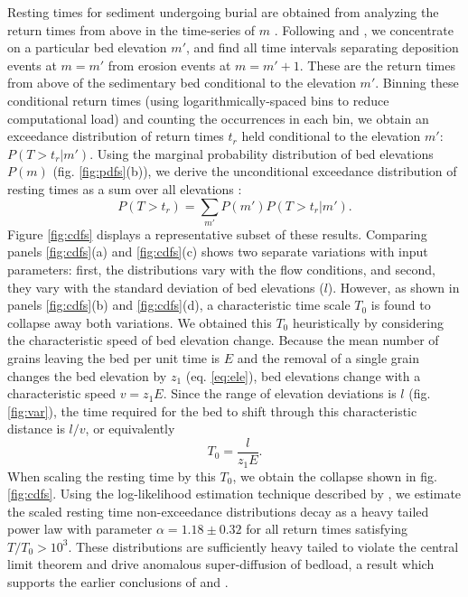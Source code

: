 Resting times for sediment undergoing burial are obtained from analyzing the return times from above in the time-series of $m$ \citep[e.g.,][]{Redner2007}.
Following \citet{Voepel2013} and \citet{Martin2014}, we concentrate on a particular bed elevation $m'$, and find all time intervals separating deposition events at $m=m'$ from erosion events at $m=m'+1$.
These are the return times from above of the sedimentary bed conditional to the elevation $m'$.
Binning these conditional return times (using logarithmically-spaced bins to reduce computational load) and counting the occurrences in each bin, we obtain an exceedance distribution of return times $t_r$ held conditional to the elevation $m'$: $P(T>t_r|m')$.
Using the marginal probability distribution of bed elevations $P(m)$ (fig. \ref{fig:pdfs}(b)), we derive the unconditional exceedance distribution of resting times as a sum over all elevations \citep{Yang1971, Nakagawa1980, Voepel2013, Martin2014}: 
\begin{equation} P(T>t_r) = \sum_{m'} P(m') P(T>t_r|m') .\end{equation}
Figure \ref{fig:cdfs} displays a representative subset of these results.
Comparing panels \ref{fig:cdfs}(a) and \ref{fig:cdfs}(c) shows two separate variations with input parameters: first, the distributions vary with the flow conditions, and second, they vary with the standard deviation of bed elevations ($l$).
However, as shown in panels \ref{fig:cdfs}(b) and \ref{fig:cdfs}(d), a characteristic time scale $T_0$ is found to collapse away both variations.
We obtained this $T_0$ heuristically by considering the characteristic speed of bed elevation change.
Because the mean number of grains leaving the bed per unit time is $E$ and the removal of a single grain changes the bed elevation by $z_1$ (eq. \ref{eq:ele}), bed elevations change with a characteristic speed $v = z_1 E$.
Since the range of elevation deviations is $l$ (fig. \ref{fig:var}), the time required for the bed to shift through this characteristic distance is $l/v$, or equivalently
\begin{equation} T_0 = \frac{l}{z_1 E}.\label{eq:time}\end{equation}
When scaling the resting time by this $T_0$, we obtain the collapse shown in fig. \ref{fig:cdfs}.
Using the log-likelihood estimation technique described by \citet{Newman2005}, we estimate the scaled resting time non-exceedance distributions decay as a heavy tailed power law with parameter $\alpha = 1.18 \pm 0.32$ for all return times satisfying $T/T_0 > 10^3$.
These distributions are sufficiently heavy tailed to violate the central limit theorem and drive anomalous super-diffusion of bedload, a result which supports the earlier conclusions of \citet{Voepel2013} and \citet{Martin2014}.

